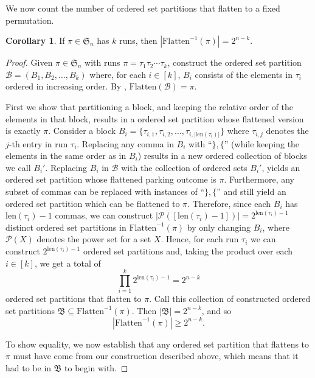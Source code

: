 \documentclass{amsart}
\newcommand{\Flatten}[0]{\mathrm{Flatten}}
\theoremstyle{definition}
\newtheorem{corollary}{Corollary}[section]
\theoremstyle{definition}
\theoremstyle{remark}
\newcommand{\len}{\mathrm{len}}
\newcommand{\Sym}{\mathfrak{S}}
\begin{document}
We now count the number of ordered set partitions that flatten to a fixed permutation.
\begin{corollary}\label{corr: count of flat(pi) is 2^n-k}
 If $\pi\in\Sym_n$ has $k$ runs, then $|\Flatten^{-1}(\pi)|=2^{n-k}$.
\end{corollary}
\begin{proof}
    Given $\pi\in\Sym_{n}$ with runs $\pi=\tau_1\tau_2\cdots\tau_k$, construct the ordered set partition $\mathcal{B}=(B_1,B_2,\ldots,B_k)$ where, for each $i\in[k]$, $B_i$ consists of the elements in $\tau_i$ ordered in increasing order.
    By , $\Flatten(\mathcal{B})=\pi$.
    
    First we show that partitioning a block, and keeping the relative order of the elements in that block, results in a ordered set partition whose flattened version is exactly $\pi$.
    Consider a block $B_i=\{\tau_{i,1},\tau_{i,2},\ldots,\tau_{i,|\len(\tau_i)|}\}$ where $\tau_{i,j}$ denotes the $j$-th entry in run $\tau_i$.
    Replacing any comma in $B_i$ with ``$\},\{$'' (while keeping the elements in the same order as in $B_i$)
    results in a new ordered collection of blocks we call $B_i'$.
    Replacing $B_i$ in $\mathcal{B}$ with the collection of ordered sets $B_i'$, yields an ordered set partition whose flattened parking outcome is $\pi$. 
    Furthermore, any subset of commas can be replaced with instances of ``$\},\{$'' and still yield an ordered set partition which can be flattened to $\pi$.
    Therefore, since each $B_i$ has $\len(\tau_i)-1$ commas, 
    we can construct $|\mathcal{P}([\len(\tau_i)-1])| = 2^{\len(\tau_i)-1}$ distinct ordered set partitions in $\Flatten^{-1}(\pi)$ by only changing $B_i$, where $\mathcal{P}(X)$ denotes the power set for a set $X$.
    Hence, for each run $\tau_i$ we can construct $2^{\len(\tau_i)-1}$ ordered set partitions and, taking the product over each $i\in[k]$, we get a total of 
    \[\prod_{i=1}^k2^{\len(\tau_i)-1}=2^{n-k}\]
    ordered set partitions that flatten to $\pi$. 
    Call this collection of constructed ordered set partitions $\mathfrak{B}\subseteq \Flatten^{-1}(\pi)$. Then $|\mathfrak{B}|=2^{n-k}$, and so
    \[|\Flatten^{-1}(\pi)|\geq 2^{n-k}.\]

    To show equality, we now establish that any ordered set partition that flattens to $\pi$ must have come from our construction described above, which means that it had to be in $\mathfrak{B}$ to begin with.
    

\end{proof}
\end{document}
